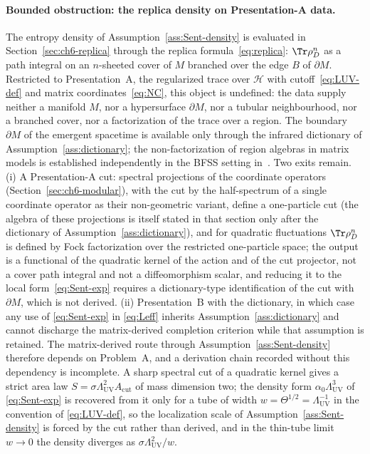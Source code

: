 \paragraph{Bounded obstruction: the replica density on Presentation-A data.}
The entropy density of Assumption~\ref{ass:Sent-density} is evaluated in
Section~\ref{sec:ch6-replica} through the replica formula~\eqref{eq:replica}:
\(\Tr\rho_D^n\) as a path integral on an \(n\)-sheeted cover of \(M\) branched
over the edge \(B\) of \(\partial M\). Restricted to Presentation~A, the
regularized trace over \(\mathcal H\) with cutoff~\eqref{eq:LUV-def} and matrix
coordinates~\eqref{eq:NC}, this object is undefined: the data supply neither a
manifold \(M\), nor a hypersurface \(\partial M\), nor a tubular neighbourhood,
nor a branched cover, nor a factorization of the trace over a region. The
boundary \(\partial M\) of the emergent spacetime is available only through the
infrared dictionary of Assumption~\ref{ass:dictionary}; the non-factorization
of region algebras in matrix models is established independently in the BFSS
setting in~\cite{Anous2020}. Two exits remain. (i) A Presentation-A cut:
spectral projections of the coordinate operators (Section~\ref{sec:ch6-modular}),
with the cut by the half-spectrum of a single coordinate operator as their
non-geometric variant, define a one-particle cut (the algebra of these
projections is itself stated in that section only after the dictionary of
Assumption~\ref{ass:dictionary}), and for quadratic fluctuations
\(\Tr\rho_D^n\) is defined by Fock factorization over the restricted
one-particle space; the
output is a functional of the quadratic kernel of the action and of the cut
projector, not a cover path integral and not a diffeomorphism scalar, and
reducing it to the local form~\eqref{eq:Sent-exp} requires a dictionary-type
identification of the cut with \(\partial M\), which is not derived.
(ii) Presentation~B with the dictionary, in which case any use of
\eqref{eq:Sent-exp} in \eqref{eq:Leff} inherits Assumption~\ref{ass:dictionary}
and cannot discharge the matrix-derived completion criterion while that
assumption is retained. The matrix-derived route through
Assumption~\ref{ass:Sent-density} therefore depends on Problem~A, and a
derivation chain recorded without this dependency is incomplete. A sharp
spectral cut of a quadratic kernel gives a strict area law
\(S=\sigma\Lambda_{\mathrm{UV}}^2 A_{\mathrm{cut}}\) of mass dimension two;
the density form \(\alpha_0\Lambda_{\mathrm{UV}}^3\) of \eqref{eq:Sent-exp} is
recovered from it only for a tube of width \(w=\Theta^{1/2}=\Lambda_{\mathrm{UV}}^{-1}\)
in the convention of \eqref{eq:LUV-def}, so the localization scale of
Assumption~\ref{ass:Sent-density} is forced by the cut rather than derived, and
in the thin-tube limit \(w\to0\) the density diverges as
\(\sigma\Lambda_{\mathrm{UV}}^2/w\).

